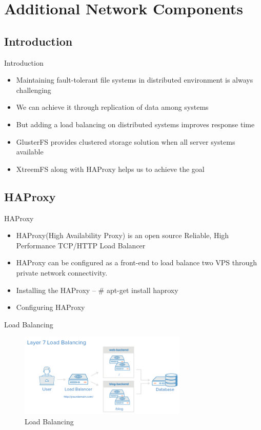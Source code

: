\documentclass[10pt,xcolor=dvipsnames]{beamer}
\begin{document}
\section{Additional Network Components}

\subsection{Introduction}
\begin{frame}{Introduction}
\begin{itemize}
 \item Maintaining fault-tolerant file systems in distributed  environment is always challenging
 \item We can achieve it through replication of data among systems
 \item But adding a load balancing on distributed systems improves response time
 \item GlusterFS provides clustered storage solution when all server systems available
 \item XtreemFS along with HAProxy helps us to achieve the goal
\end{itemize}
\end{frame}

\subsection{HAProxy}
\begin{frame}{HAProxy}
\begin{itemize}
\item HAProxy(High Availability Proxy) is an open source Reliable, High Performance TCP/HTTP Load Balancer
\item HAProxy can be configured as a front-end to load balance two VPS through private network connectivity.
\item Installing the HAProxy -- \# apt-get install haproxy
\item Configuring HAProxy 
\end{itemize}

\end{frame}

\begin{frame}{Load Balancing}
\begin{figure}[H]
\begin{center}
\includegraphics[width=8cm,height=4cm]{Layer7LoadBalancing.PNG}
\caption{Load Balancing }
\end{center}
\end{figure}
\end{frame}
\end{document}
